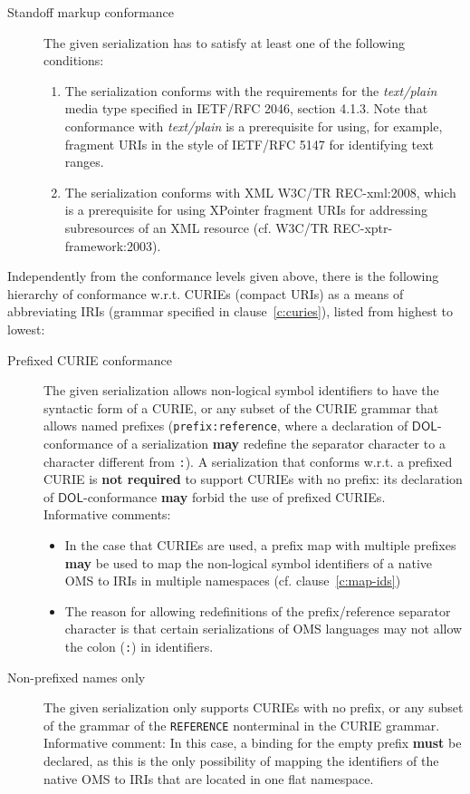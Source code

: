 \documentclass[10pt,fleqn,final]{scrreprt}
\makeatletter
\newcommand*{\cf}{cf.\@\xspace}
\newcommand*{\wrt}{w.r.t.\@\xspace}
\newcommand*\CommentAuthor{}
\renewcommand*\CommentAuthor{#1}}
\newcommand*\CommentDate{}
\renewcommand*\CommentDate{#1}}
\newcommand*\CommentId{}
\renewcommand*\CommentId{#1}}
\newcommand*\CommentType{}
\renewcommand*\CommentType{#1}}
\newcommand*{\SetCommentColorByType}[1]{%
\edef\localType{{#1}}%
\expandafter\ifstrequal\localType{q-aut}{\colorlet{CommentColor}{red}}{%
\expandafter\ifstrequal\localType{q-all}{\colorlet{CommentColor}{orange}}{%
\expandafter\ifstrequal\localType{todo}{\colorlet{CommentColor}{orange}}{%
\expandafter\ifstrequal\localType{fyi}{\colorlet{CommentColor}{lightgray}}{%
\colorlet{CommentColor}{yellow}}}}}}
\newcommand*{\SetCommentPrefixByType}[1]{%
\edef\localType{{#1}}%
\expandafter\@ifmtarg\localType{%
\edef\CommentPrefix{}%
}{%
\caseupper[q]{#1}%
\edef\CommentPrefix{\thestring: }%
}}
\newcommand*{\initComment}[1]{%
\setkeys{Comment}{#1}%
\SetCommentColorByType{\CommentType}%
\relax%
\SetCommentPrefixByType{\CommentType}%
\relax%
}
\newcommand*{\todonote}[2][]{%
\initComment{#1}%
\pdfcomment[author=\CommentAuthor,color=CommentColor,date=\CommentDate,id=\CommentId]{%
\CommentPrefix
#2}}
\renewcommand*{\todonote}[2][]{%
\initComment{#1}%
\ednote{\CommentPrefix #2}}
\newcommand*{\mimetype}[1]{\textit{#1}}
\newcommand*{\syntax}[1]{\texttt{#1}}
\newcommand*{\notrequired}{\textbf{not required}\xspace}
\newcommand*{\may}{\textbf{may}\xspace}
\newcommand*{\hasto}{\textbf{must}\xspace}
\newcommand*{\DOL}{\ensuremath{\mathsf{DOL}}\xspace}
\newcommand{\clauserefname}{clause}
\newcommand{\cref}[1]{\clauserefname~\ref{#1}}
\newcommand{\nisref}[1]{#1}
\makeatother
\begin{document}
\begin{description}
\item[Standoff markup conformance]
The given serialization has to satisfy at least one of the following conditions:
\begin{enumerate}
\item\label{it:standoff-text-plain} The serialization conforms with the requirements for the \mimetype{text/plain} media type specified in \nisref{IETF/RFC 2046}, section 4.1.3.
Note that conformance with \mimetype{text/plain} is a prerequisite for using, for
example, fragment URIs in the style of \nisref{IETF/RFC 5147} for identifying text ranges.
\item\label{it:standoff-xpointer} The serialization conforms with XML \nisref{W3C/TR REC-xml:2008}, which is a prerequisite for using XPointer fragment URIs for addressing subresources of an XML resource (cf. \nisref{W3C/TR REC-xptr-framework:2003}).
\end{enumerate}
\end{description}


Independently from the conformance levels given above, there is the following hierarchy of conformance \wrt CURIEs (compact URIs) as a means of abbreviating IRIs (grammar specified in \cref{c:curies}), listed from highest to lowest:
\begin{description}
\item[Prefixed CURIE conformance] The given serialization allows non-logical symbol identifiers to have the syntactic form of a CURIE, or any subset of the CURIE grammar that allows named prefixes (\syntax{prefix:reference}, where a declaration of \DOL-conformance of a serialization \may redefine the separator character to a character different from \syntax{:}).  A serialization that conforms \wrt a prefixed CURIE  is \notrequired to support CURIEs with no prefix: its declaration of \DOL-conformance \may forbid the use of prefixed CURIEs.\\
  Informative comments:
  \begin{itemize}
  \item In the case that CURIEs are used, a prefix map with multiple prefixes \may be used to map the non-logical symbol identifiers of a native OMS to IRIs in multiple namespaces (\cf \cref{c:map-ids})
  \item The reason for allowing redefinitions of the prefix/reference separator character is that certain serializations of OMS languages may not allow the colon (\syntax{:}) in identifiers.
  \end{itemize}
\item[Non-prefixed names only] The given serialization only supports CURIEs with no prefix, or any subset of the grammar of the \syntax{REFERENCE} nonterminal in the CURIE grammar.\\
  Informative comment: In this case, a binding for the empty prefix \hasto be declared, as this is the only possibility of mapping the identifiers of the native OMS to IRIs that are located in one flat namespace.
\end{description}
\end{document}
